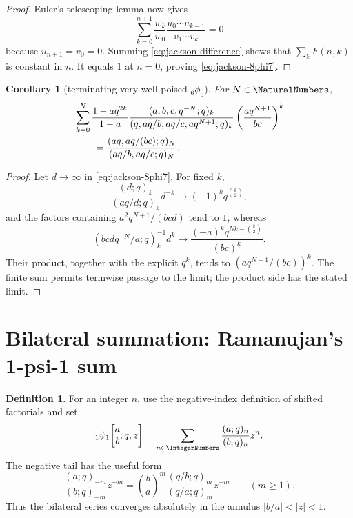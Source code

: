 \documentclass[11pt,oneside]{article}
\newtheorem{corollary}[theorem]{Corollary}
\theoremstyle{definition}
\newtheorem{definition}[theorem]{Definition}
\begin{document}
\begin{proof}
Euler's telescoping lemma now gives
\[
 \sum_{k=0}^{n+1}\frac{w_k}{w_0}
 \frac{u_0\cdots u_{k-1}}{v_1\cdots v_k}=0
\]
because $u_{n+1}=v_0=0$. Summing \eqref{eq:jackson-difference} shows that $\sum_kF(n,k)$ is constant in $n$. It equals $1$ at $n=0$, proving \eqref{eq:jackson-8phi7}.
\end{proof}

\begin{corollary}[terminating very-well-poised ${}_6\phi_5$]\label{cor:terminating-6phi5}
For $N\in\NaturalNumbers$,
\begin{align}
&\sum_{k=0}^{N}\frac{1-aq^{2k}}{1-a}
 \frac{(a,b,c,q^{-N};q)_k}
 {(q,aq/b,aq/c,aq^{N+1};q)_k}
 \left(\frac{aq^{N+1}}{bc}\right)^k\notag\\
&\qquad=\frac{(aq,aq/(bc);q)_N}{(aq/b,aq/c;q)_N}.
\label{eq:terminating-6phi5}
\end{align}
\end{corollary}

\begin{proof}
Let $d\to\infty$ in \eqref{eq:jackson-8phi7}. For fixed $k$,
\[
 \frac{(d;q)_k}{(aq/d;q)_k}d^{-k}
 \longrightarrow(-1)^kq^{\binom k2},
\]
and the factors containing $a^2q^{N+1}/(bcd)$ tend to $1$, whereas
\[
 (bcdq^{-N}/a;q)_k^{-1}d^k
 \longrightarrow
 \frac{(-a)^kq^{Nk-\binom k2}}{(bc)^k}.
\]
Their product, together with the explicit $q^k$, tends to
$(aq^{N+1}/(bc))^k$. The finite sum permits termwise passage to the limit; the product side has the stated limit.
\end{proof}

\section{Bilateral summation: Ramanujan's 1-psi-1 sum}

\begin{definition}
For an integer $n$, use the negative-index definition of shifted factorials and set
\[
 {}_1\psi_1\!\left[\begin{matrix}a\\b\end{matrix};q,z\right]
 =\sum_{n\in\IntegerNumbers}\frac{(a;q)_n}{(b;q)_n}z^n.
\]
The negative tail has the useful form
\begin{equation}\label{eq:negative-tail}
 \frac{(a;q)_{-m}}{(b;q)_{-m}}z^{-m}
 =\left(\frac ba\right)^m
 \frac{(q/b;q)_m}{(q/a;q)_m}z^{-m}
 \qquad(m\ge1).
\end{equation}
Thus the bilateral series converges absolutely in the annulus
$|b/a|<|z|<1$.
\end{definition}
\end{document}
